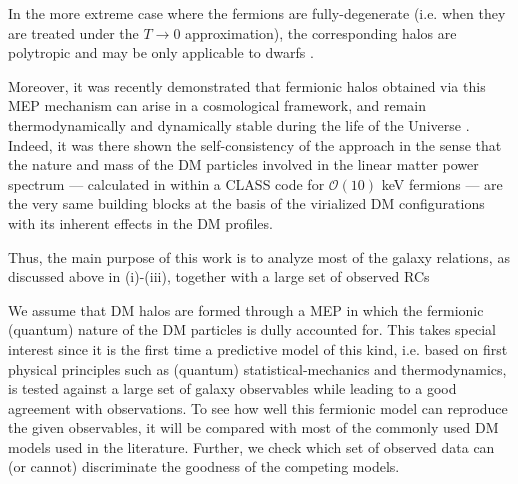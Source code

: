 \begin{asparaenum}[(1)]
    \item In the more extreme case where the fermions are fully-degenerate (i.e. when they are treated under the $T \to 0$ approximation), the corresponding halos are polytropic and may be only applicable to dwarfs \citep{2015JCAP...01..002D}.
\end{asparaenum}

Moreover, it was recently demonstrated that fermionic halos obtained via this MEP mechanism can arise in a cosmological framework, and remain thermodynamically and dynamically stable during the life of the Universe \citep{2021MNRAS.502.4227A}. Indeed, it was there shown the self-consistency of the approach in the sense that the nature and mass of the DM particles involved in the linear matter power spectrum --- calculated in \citet{2021MNRAS.502.4227A} within a CLASS code for $\mathcal{O}(10)$ keV fermions --- are the very same building blocks at the basis of the virialized DM configurations with its inherent effects in the DM profiles.  

Thus, the main purpose of this work is to analyze most of the galaxy relations, as discussed above in (i)-(iii), together with a large set of observed RCs 

We assume that DM halos are formed through a MEP in which the fermionic (quantum) nature of the DM particles is dully accounted for. This takes special interest since it is the first time a predictive model of this kind, i.e. based on first physical principles such as (quantum) statistical-mechanics and thermodynamics, is tested against a large set of galaxy observables while leading to a good agreement with observations. To see how well this fermionic model can reproduce the given observables, it will be compared with most of the commonly used DM models used in the literature. Further, we check which set of observed data can (or cannot) discriminate the goodness of the competing models.

